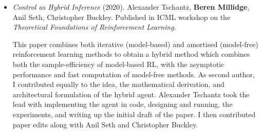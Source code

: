 \begin{itemize}
\item \emph{Control as Hybrid Inference} (2020). Alexander Tschantz, \textbf{Beren Millidge}, Anil Seth, Christopher Buckley. Published in ICML workshop on the \emph{Theoretical Foundations of Reinforcement Learning}. \newline 

This paper combines both iterative (model-based) and amortised (model-free) reinforcement learning methods to obtain a hybrid method which combines both the sample-efficiency of model-based RL, with the asymptotic performance and fast computation of model-free methods. As second author, I contributed equally to the idea, the mathematical derivation, and architectural formulation of the hybrid agent. Alexander Tschantz took the lead with implementing the agent in code, designing and running, the experiments, and writing up the initial draft of the paper. I then contributed paper edits along with Anil Seth and Christopher Buckley.
\end{itemize}

